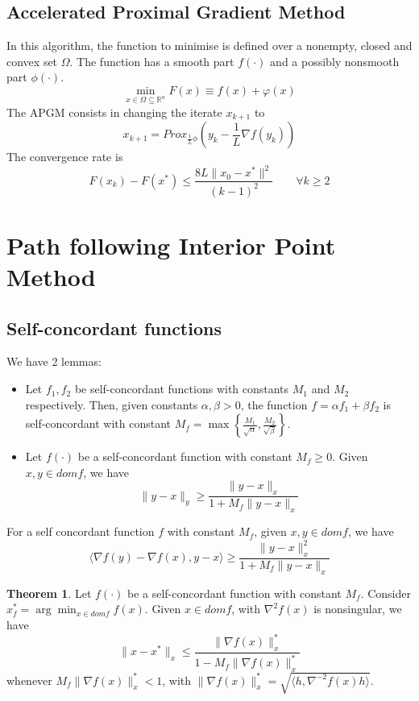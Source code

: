 \documentclass[12pt, openany]{report}
\newcommand{\R}{\mathbb{R}}
\theoremstyle{definition}
\newtheorem{thm}{Theorem}[chapter]
\begin{document}
\subsection{Accelerated Proximal Gradient Method}
In this algorithm, the function to minimise is defined over a nonempty, closed and convex set $\Omega$. The function has a smooth part $f(\cdot)$ and a possibly nonsmooth part $\phi(\cdot)$. 
\begin{equation}
	\min_{x \in \Omega\subseteq \R^n} F(x)\equiv f(x) + \varphi(x)
\end{equation}
The APGM consists in changing the iterate $x_{k+1}$ to 
\begin{equation}
	x_{k+1} = Prox_{\frac{1}{L}\phi}\left(y_k - \frac{1}{L}\nabla f(y_k)\right)
\end{equation}
The convergence rate is 
\begin{equation}
	F(x_k)-F(x^*) \le \frac{8L\|x_0-x^*\|^2}{(k-1)^2} \qquad \forall k\ge 2
\end{equation}
\section{Path following Interior Point Method}
\subsection{Self-concordant functions}
We have 2 lemmas:
\begin{itemize}
	\item Let $f_1,f_2$ be self-concordant functions with constants $M_1$ and $M_2$ respectively. Then, given constants $\alpha,\beta>0$, the function $f=\alpha f_1 + \beta f_2$ is self-concordant with constant $M_f = \max\left\{\frac{M_1}{\sqrt{\alpha}}, \frac{M_2}{\sqrt{\beta}}\right\}$.
	\item Let $f(\cdot)$ be a self-concordant function with constant $M_f\ge 0$. Given $x,y\in domf$, we have 
	\begin{equation}
		\|y-x\|_y \ge \frac{\|y-x\|_x}{1+M_f \|y-x\|_x}
	\end{equation}
\end{itemize}
For a self concordant function $f$ with constant $M_f$, given $x,y\in domf$, we have 
\begin{equation}
	\langle \nabla f(y)-\nabla f(x),y-x\rangle \ge \frac{\|y-x\|_x^2}{1+M_f\|y-x\|_x}
\end{equation}
\begin{thm}
	Let $f(\cdot)$ be a self-concordant function with constant $M_f$. Consider $x_f^* = \arg\min_{x\in domf}f(x)$. Given $x\in domf$, with $\nabla^2 f(x)$ is nonsingular, we have 
	\begin{equation}
		\|x-x^*\|_x \le \frac{\|\nabla f(x)\|_x^*}{1-M_f\|\nabla f(x)\|_x^*}
	\end{equation}
	whenever $M_f\|\nabla f(x)\|_x^* < 1$, with $\|\nabla f(x)\|_x^* = \sqrt{\langle h, \nabla^{-2}f(x)h\rangle}$.
\end{thm}
\end{document}
